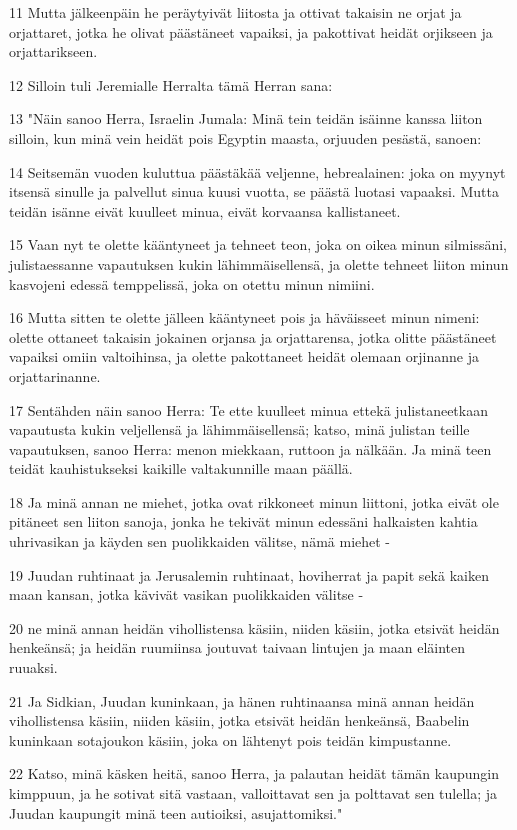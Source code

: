 \par 11 Mutta jälkeenpäin he peräytyivät liitosta ja ottivat takaisin ne orjat ja orjattaret, jotka he olivat päästäneet vapaiksi, ja pakottivat heidät orjikseen ja orjattarikseen.
\par 12 Silloin tuli Jeremialle Herralta tämä Herran sana:
\par 13 "Näin sanoo Herra, Israelin Jumala: Minä tein teidän isäinne kanssa liiton silloin, kun minä vein heidät pois Egyptin maasta, orjuuden pesästä, sanoen:
\par 14 Seitsemän vuoden kuluttua päästäkää veljenne, hebrealainen: joka on myynyt itsensä sinulle ja palvellut sinua kuusi vuotta, se päästä luotasi vapaaksi. Mutta teidän isänne eivät kuulleet minua, eivät korvaansa kallistaneet.
\par 15 Vaan nyt te olette kääntyneet ja tehneet teon, joka on oikea minun silmissäni, julistaessanne vapautuksen kukin lähimmäisellensä, ja olette tehneet liiton minun kasvojeni edessä temppelissä, joka on otettu minun nimiini.
\par 16 Mutta sitten te olette jälleen kääntyneet pois ja häväisseet minun nimeni: olette ottaneet takaisin jokainen orjansa ja orjattarensa, jotka olitte päästäneet vapaiksi omiin valtoihinsa, ja olette pakottaneet heidät olemaan orjinanne ja orjattarinanne.
\par 17 Sentähden näin sanoo Herra: Te ette kuulleet minua ettekä julistaneetkaan vapautusta kukin veljellensä ja lähimmäisellensä; katso, minä julistan teille vapautuksen, sanoo Herra: menon miekkaan, ruttoon ja nälkään. Ja minä teen teidät kauhistukseksi kaikille valtakunnille maan päällä.
\par 18 Ja minä annan ne miehet, jotka ovat rikkoneet minun liittoni, jotka eivät ole pitäneet sen liiton sanoja, jonka he tekivät minun edessäni halkaisten kahtia uhrivasikan ja käyden sen puolikkaiden välitse, nämä miehet -
\par 19 Juudan ruhtinaat ja Jerusalemin ruhtinaat, hoviherrat ja papit sekä kaiken maan kansan, jotka kävivät vasikan puolikkaiden välitse -
\par 20 ne minä annan heidän vihollistensa käsiin, niiden käsiin, jotka etsivät heidän henkeänsä; ja heidän ruumiinsa joutuvat taivaan lintujen ja maan eläinten ruuaksi.
\par 21 Ja Sidkian, Juudan kuninkaan, ja hänen ruhtinaansa minä annan heidän vihollistensa käsiin, niiden käsiin, jotka etsivät heidän henkeänsä, Baabelin kuninkaan sotajoukon käsiin, joka on lähtenyt pois teidän kimpustanne.
\par 22 Katso, minä käsken heitä, sanoo Herra, ja palautan heidät tämän kaupungin kimppuun, ja he sotivat sitä vastaan, valloittavat sen ja polttavat sen tulella; ja Juudan kaupungit minä teen autioiksi, asujattomiksi."

